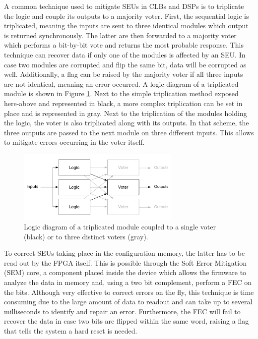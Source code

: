     A common technique used to mitigate SEUs in CLBs and DSPs is to triplicate the logic and couple its outputs to a majority voter. First, the sequential logic is triplicated, meaning the inputs are sent to three identical modules which output is returned synchronously. The latter are then forwarded to a majority voter which performs a bit-by-bit vote and returns the most probable response. This technique can recover data if only one of the modules is affected by an SEU. In case two modules are corrupted and flip the same bit, data will be corrupted as well. Additionally, a flag can be raised by the majority voter if all three inputs are not identical, meaning an error occurred. A logic diagram of a triplicated module is shown in Figure \ref{fig:II-5-tmr}. Next to the simple triplication method exposed here-above and represented in black, a more complex triplication can be set in place and is represented in gray. Next to the triplication of the modules holding the logic, the voter is also triplicated along with its outputs. In that scheme, the three outputs are passed to the next module on three different inputs. This allows to mitigate errors occurring in the voter itself. \\

    \begin{figure}[h!]
      \centering
      \includegraphics[width=0.7\textwidth]{img/II-5-irradiation/tmr}
      \caption{Logic diagram of a triplicated module coupled to a single voter (black) or to three distinct voters (gray).}
      \label{fig:II-5-tmr}
    \end{figure}

    To correct SEUs taking place in the configuration memory, the latter has to be read out by the FPGA itself. This is possible through the Soft Error Mitigation (SEM) core, a component placed inside the device which allows the firmware to analyze the data in memory and, using a two bit complement, perform a FEC on the bits. Although very effective to correct errors on the fly, this technique is time consuming due to the large amount of data to readout and can take up to several milliseconds to identify and repair an error. Furthermore, the FEC will fail to recover the data in case two bits are flipped within the same word, raising a flag that tells the system a hard reset is needed. \\

